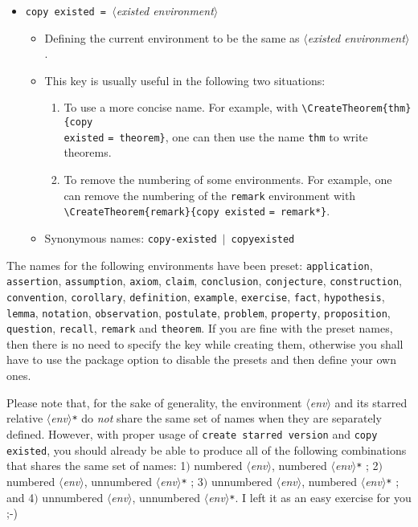 \documentclass[classical]{einfart}
\newcommand{\meta}[1]{$\langle${\normalfont\itshape#1}$\rangle$}
\newcommand{\packageoption}[1]{\texttt{\textcolor{code-option}{#1}}}
\newcommand{\commandoption}[1]{\texttt{\textcolor{code-keys}{#1}}}
\newenvironment{tip}[1][Tip]
  {%
    \LocallyStopLineNumbers%
    \begin{tcolorbox}[breakable,
        enhanced,
        width = \textwidth,
        colback = paper, colbacktitle = paper,
        colframe = gray!50, boxrule=0.2mm,
        coltitle = black,
        fonttitle = \sffamily,
        attach boxed title to top left = {yshift=-\tcboxedtitleheight/2, xshift=.5cm},
        boxed title style = {boxrule=0pt, colframe=paper},
        before skip = 3mm,
        after skip = 3mm,
        top = 2.5mm,
        bottom = 1.5mm,
        title={\scshape\sffamily #1}]%
  }
  {%
    \end{tcolorbox}%
    \ResumeLineNumbers%
  }
\begin{document}
\begin{itemize}[label=,leftmargin=1.25em,itemindent=-1.25em]
\begin{itemize}
        \end{itemize}
\pagebreak
    \item \commandoption{copy existed}\lstinline| = |\meta{existed environment}
        \begin{itemize}
            \item Defining the current environment to be the same as \meta{existed environment}.
            \item This key is usually useful in the following two situations:
                \begin{enumerate}
                    \item To use a more concise name. For example, with \lstinline|\CreateTheorem{thm}{|\commandoption{copy \\existed} \lstinline|= theorem}|, one can then use the name \texttt{thm} to write theorems.
                    \item To remove the numbering of some environments. For example, one can remove the numbering of the \texttt{remark} environment with \lstinline|\CreateTheorem{remark}{|\commandoption{copy existed} \lstinline|= remark*}|.
                \end{enumerate}
            \item Synonymous names: \commandoption{copy-existed} \,$|$\, \commandoption{copyexisted}
        \end{itemize}
\end{itemize}

\begin{tip}
    The names for the following environments have been preset: \texttt{application}, \texttt{assertion}, \texttt{assumption}, \texttt{axiom}, \texttt{claim}, \texttt{conclusion}, \texttt{conjecture}, \texttt{construction}, \texttt{convention}, \texttt{corollary}, \texttt{definition}, \texttt{example}, \texttt{exercise}, \texttt{fact}, \texttt{hypothesis}, \texttt{lemma}, \texttt{notation}, \texttt{observation}, \texttt{postulate}, \texttt{problem}, \texttt{property}, \texttt{proposition}, \texttt{question}, \texttt{recall}, \texttt{remark} and \texttt{theorem}. If you are fine with the preset names, then there is no need to specify the key \textquote{\commandoption{name}} while creating them, otherwise you shall have to use the package option \textquote{\packageoption{no preset names}} to disable the presets and then define your own ones.
\end{tip}

\medskip

Please note that, for the sake of generality, the environment \meta{env} and its starred relative \meta{env}\texttt{*} do \emph{not} share the same set of names when they are separately defined. However, with proper usage of \commandoption{create starred version} and \commandoption{copy existed}, you should already be able to produce all of the following combinations that shares the same set of names: 1$)$ numbered \meta{env}, numbered \meta{env}\texttt{*} ; 2$)$ numbered \meta{env}, unnumbered \meta{env}\texttt{*} ; 3$)$ unnumbered \meta{env}, numbered \meta{env}\texttt{*} ; and 4$)$ unnumbered \meta{env}, unnumbered \meta{env}\texttt{*}. I left it as an easy exercise for you ;-)
\end{document}
